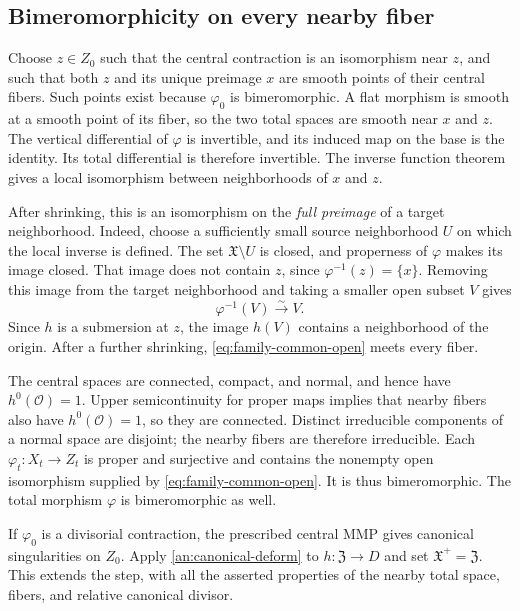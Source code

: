 \documentclass[11pt,a4paper]{article}
\theoremstyle{definition}\newtheorem{definition}[theorem]{Definition}
\theoremstyle{remark}\newtheorem*{remark}{Remark}
\newcommand{\OO}{\mathcal O}
\begin{document}
\subsection{Bimeromorphicity on every nearby fiber}

Choose $z\in Z_0$ such that the central contraction is an
isomorphism near $z$, and such that both $z$ and its unique
preimage $x$ are smooth points of their central fibers. Such
points exist because $\varphi_0$ is bimeromorphic. A flat
morphism is smooth at a smooth point of its fiber, so the two
total spaces are smooth near $x$ and $z$. The vertical
differential of $\varphi$ is invertible, and its induced map on
the base is the identity. Its total differential is therefore
invertible. The inverse function theorem gives a local
isomorphism between neighborhoods of $x$ and $z$.

After shrinking, this is an isomorphism on the \emph{full preimage}
of a target neighborhood. Indeed, choose a sufficiently small source
neighborhood $U$ on which the local inverse is defined.
The set $\mathfrak X\setminus U$ is closed, and properness of
$\varphi$ makes its image closed. That image does not contain
$z$, since $\varphi^{-1}(z)=\{x\}$. Removing this image from
the target neighborhood and taking a smaller open subset $V$ gives
\begin{equation}\label{eq:family-common-open}
 \varphi^{-1}(V)\xrightarrow{\sim}V.
\end{equation}
Since $h$ is a submersion at $z$, the image $h(V)$ contains a
neighborhood of the origin. After a further shrinking,
\eqref{eq:family-common-open} meets every fiber.

The central spaces are connected, compact, and normal, and hence
have $h^0(\OO)=1$. Upper semicontinuity for proper maps implies that nearby
fibers also have $h^0(\OO)=1$, so they are connected.
Distinct irreducible components of a normal space are disjoint;
the nearby fibers are therefore irreducible. Each
$\varphi_t:X_t\to Z_t$ is proper and surjective and contains the
nonempty open isomorphism supplied by
\eqref{eq:family-common-open}. It is thus bimeromorphic.
The total morphism $\varphi$ is bimeromorphic as well.

If $\varphi_0$ is a divisorial contraction, the prescribed central
MMP gives canonical singularities on $Z_0$. Apply
\ref{an:canonical-deform} to $h:\mathfrak Z\to D$ and set
$\mathfrak X^+=\mathfrak Z$. This extends the step, with all the
asserted properties of the nearby total space, fibers, and relative
canonical divisor.
\end{document}
